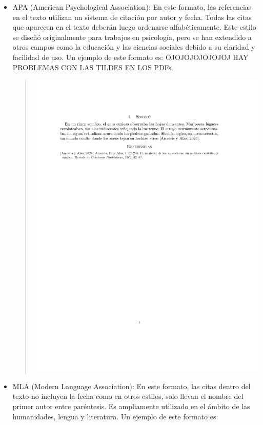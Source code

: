 \begin{itemize}
    \item APA (American Psychological Association): En este formato, las referencias en el texto utilizan un sistema de citación por autor y fecha. Todas las citas que aparecen en el texto deberán luego ordenarse alfabéticamente. Este estilo se diseñó originalmente para trabajos en psicología, pero se han extendido a otros campos como la educación y las ciencias sociales debido a su claridad y facilidad de uso. Un ejemplo de este formato es: OJOJOJOJOJOJOJ HAY PROBLEMAS CON LAS TILDES EN LOS PDFs.
    \begin{quote}
        \includegraphics[scale=0.6, trim={2cm 20cm 3cm 3cm}, clip]{images/apa.pdf}
    \end{quote}
    \item MLA (Modern Language Association): En este formato, las citas dentro del texto no incluyen la fecha como en otros estilos, solo llevan el nombre del primer autor entre paréntesis. Es ampliamente utilizado en el ámbito de las humanidades, lengua y literatura. Un ejemplo de este formato es:

\end{itemize}
